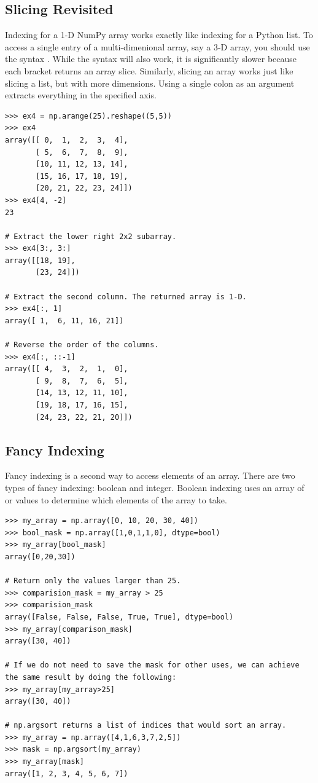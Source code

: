\subsection*{Slicing Revisited} 
Indexing for a 1-D NumPy array works exactly like indexing for a Python list. 
To access a single entry of a multi-dimenional array, say a 3-D array, you should use the syntax . 
While the syntax  will also work, it is significantly slower because each bracket returns an array slice. 
Similarly, slicing an array works just like slicing a list, but with more dimensions. Using a single colon as an argument extracts everything in the specified axis.
\begin{lstlisting}
>>> ex4 = np.arange(25).reshape((5,5)) 
>>> ex4
array([[ 0,  1,  2,  3,  4],
       [ 5,  6,  7,  8,  9],
       [10, 11, 12, 13, 14],
       [15, 16, 17, 18, 19],
       [20, 21, 22, 23, 24]])
>>> ex4[4, -2]
23

# Extract the lower right 2x2 subarray.
>>> ex4[3:, 3:] 
array([[18, 19],
       [23, 24]])
       
# Extract the second column. The returned array is 1-D.
>>> ex4[:, 1] 
array([ 1,  6, 11, 16, 21]) 

# Reverse the order of the columns.
>>> ex4[:, ::-1] 
array([[ 4,  3,  2,  1,  0],
       [ 9,  8,  7,  6,  5],
       [14, 13, 12, 11, 10],
       [19, 18, 17, 16, 15],
       [24, 23, 22, 21, 20]])
\end{lstlisting}

\subsection*{Fancy Indexing}
Fancy indexing is a second way to access elements of an array. 
There are two types of fancy indexing: boolean and integer. 
Boolean indexing uses an array of  or  values to 
determine which elements of the array to take. 

\begin{lstlisting}
>>> my_array = np.array([0, 10, 20, 30, 40])
>>> bool_mask = np.array([1,0,1,1,0], dtype=bool)
>>> my_array[bool_mask]
array([0,20,30])

# Return only the values larger than 25.
>>> comparision_mask = my_array > 25
>>> comparision_mask
array([False, False, False, True, True], dtype=bool)
>>> my_array[comparison_mask]
array([30, 40])

# If we do not need to save the mask for other uses, we can achieve the same result by doing the following:
>>> my_array[my_array>25]
array([30, 40])

# np.argsort returns a list of indices that would sort an array.
>>> my_array = np.array([4,1,6,3,7,2,5])
>>> mask = np.argsort(my_array)
>>> my_array[mask]
array([1, 2, 3, 4, 5, 6, 7])
\end{lstlisting}

